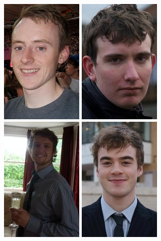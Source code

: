 \begin{figure}[h]
    \begin{center}
        \includegraphics[scale=0.5]{images/bernard}
        \includegraphics[scale=0.5]{images/greg}
        \includegraphics[scale=0.5]{images/nathan}
        \includegraphics[scale=0.5]{images/robin}

\end{center}
\end{figure}
